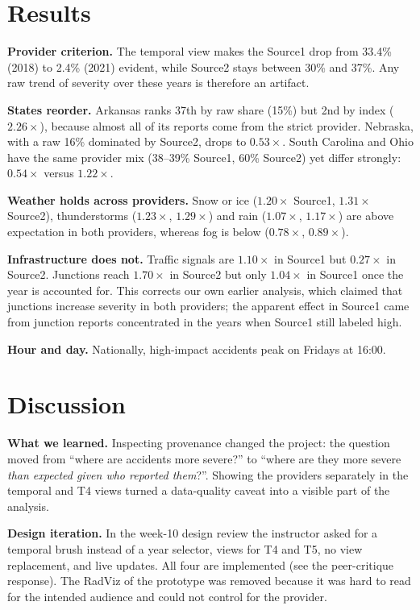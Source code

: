 \documentclass[conference]{IEEEtran}
\begin{document}
\section{Results}

\textbf{Provider criterion.} The temporal view makes the Source1 drop from 33.4\% (2018) to 2.4\% (2021) evident, while Source2 stays between 30\% and 37\%. Any raw trend of severity over these years is therefore an artifact.

\textbf{States reorder.} Arkansas ranks 37th by raw share (15\%) but 2nd by index ($2.26\times$), because almost all of its reports come from the strict provider. Nebraska, with a raw 16\% dominated by Source2, drops to $0.53\times$. South Carolina and Ohio have the same provider mix (38--39\% Source1, 60\% Source2) yet differ strongly: $0.54\times$ versus $1.22\times$.

\textbf{Weather holds across providers.} Snow or ice ($1.20\times$ Source1, $1.31\times$ Source2), thunderstorms ($1.23\times$, $1.29\times$) and rain ($1.07\times$, $1.17\times$) are above expectation in both providers, whereas fog is below ($0.78\times$, $0.89\times$).

\textbf{Infrastructure does not.} Traffic signals are $1.10\times$ in Source1 but $0.27\times$ in Source2. Junctions reach $1.70\times$ in Source2 but only $1.04\times$ in Source1 once the year is accounted for. This corrects our own earlier analysis, which claimed that junctions increase severity in both providers; the apparent effect in Source1 came from junction reports concentrated in the years when Source1 still labeled high.

\textbf{Hour and day.} Nationally, high-impact accidents peak on Fridays at 16:00.

\section{Discussion}

\textbf{What we learned.} Inspecting provenance changed the project: the question moved from ``where are accidents more severe?'' to ``where are they more severe \emph{than expected given who reported them}?''. Showing the providers separately in the temporal and T4 views turned a data-quality caveat into a visible part of the analysis.

\textbf{Design iteration.} In the week-10 design review the instructor asked for a temporal brush instead of a year selector, views for T4 and T5, no view replacement, and live updates. All four are implemented (see the peer-critique response). The RadViz of the prototype was removed because it was hard to read for the intended audience and could not control for the provider.
\end{document}
